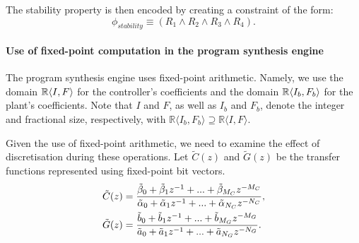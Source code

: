 \documentclass{sig-alternate-05-2015}
\newcommand{\red}[1]{{\color{red}#1}}
\begin{document}
The stability property is then encoded by creating a
constraint of the form:
$$
\phi_{stability} \equiv (R_1 \wedge R_2 \wedge R_3 \wedge R_4).
$$


\paragraph{Use of fixed-point computation in the program synthesis engine}
The program synthesis engine uses fixed-point arithmetic.
Namely, we use the domain $\mathbb{R}\langle{I},{F}\rangle$
for the controller's coefficients and the domain 
$\mathbb{R}\langle{I_b},{F_b}\rangle$ for the plant's coefficients.
Note that $I$ and $F$, as well as $I_b$ and $F_b$, 
denote the integer and fractional size, respectively, with
$\mathbb{R}\langle I_b,F_b \rangle \supseteq \mathbb{R}\langle I,F \rangle$.

Given the use of fixed-point arithmetic, 
we need to examine the effect of discretisation during these operations.
Let $\tilde C(z)$ and $\tilde G(z)$ be the transfer functions represented
using fixed-point bit vectors.%
%
\begin{align}
\small
\label{digital_controller_plant_tf}
\tilde C(z)&=\frac{\tilde \beta_{0}+\tilde \beta_{1}z^{-1}+...+\tilde \beta_{M_C}z^{-M_C}}{\tilde \alpha_{0}+\tilde \alpha_{1}z^{-1}+...+\tilde \alpha_{N_C}z^{-N_C}}, \\
\tilde G(z)&=\frac{\tilde b_{0}+\tilde b_{1}z^{-1}+...+\tilde b_{M_G}z^{-M_G}}{\tilde a_{0}+\tilde a_{1}z^{-1}+...+\tilde a_{N_G}z^{-N_G}}.
\end{align}
 
\end{document}
